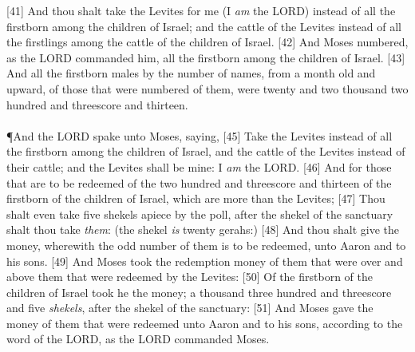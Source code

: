 [41] \textcolor[cmyk]{0.99998,1,0,0}{And thou shalt take the Levites for me (I \emph{am} the LORD) instead of all the firstborn among the children of Israel; and the cattle of the Levites instead of all the firstlings among the cattle of the children of Israel.}
[42] \textcolor[cmyk]{0.99998,1,0,0}{And Moses numbered, as the LORD commanded him, all the firstborn among the children of Israel.}
[43] \textcolor[cmyk]{0.99998,1,0,0}{And all the firstborn males by the number of names, from a month old and upward, of those that were numbered of them, were twenty and two thousand two hundred and threescore and thirteen.}\\
\\
\P \textcolor[cmyk]{0.99998,1,0,0}{And the LORD spake unto Moses, saying,}
[45] \textcolor[cmyk]{0.99998,1,0,0}{Take the Levites instead of all the firstborn among the children of Israel, and the cattle of the Levites instead of their cattle; and the Levites shall be mine: I \emph{am} the LORD.}
[46] \textcolor[cmyk]{0.99998,1,0,0}{And for those that are to be redeemed of the two hundred and threescore and thirteen of the firstborn of the children of Israel, which are more than the Levites;}
[47] \textcolor[cmyk]{0.99998,1,0,0}{Thou shalt even take five shekels apiece by the poll, after the shekel of the sanctuary shalt thou take \emph{them}: (the shekel \emph{is} twenty gerahs:)}
[48] \textcolor[cmyk]{0.99998,1,0,0}{And thou shalt give the money, wherewith the odd number of them is to be redeemed, unto Aaron and to his sons.}
[49] \textcolor[cmyk]{0.99998,1,0,0}{And Moses took the redemption money of them that were over and above them that were redeemed by the Levites:}
[50] \textcolor[cmyk]{0.99998,1,0,0}{Of the firstborn of the children of Israel took he the money; a thousand three hundred and threescore and five \emph{shekels}, after the shekel of the sanctuary:}
[51] \textcolor[cmyk]{0.99998,1,0,0}{And Moses gave the money of them that were redeemed unto Aaron and to his sons, according to the word of the LORD, as the LORD commanded Moses.}